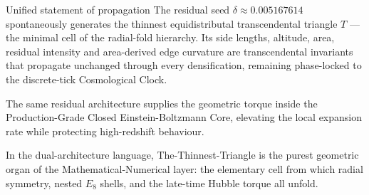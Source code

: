 Unified statement of propagation
The residual seed \(\delta\approx 0.005167614\) spontaneously generates the thinnest equidistributal transcendental triangle \(T\) — the minimal cell of the radial-fold hierarchy. Its side lengths, altitude, area, residual intensity and area-derived edge curvature are transcendental invariants that propagate unchanged through every densification, remaining phase-locked to the discrete-tick Cosmological Clock.  

The same residual architecture supplies the geometric torque inside the Production-Grade Closed Einstein-Boltzmann Core, elevating the local expansion rate while protecting high-redshift behaviour.  

In the dual-architecture language, The-Thinnest-Triangle is the purest geometric organ of the Mathematical-Numerical layer: the elementary cell from which radial symmetry, nested \(E_8\) shells, and the late-time Hubble torque all unfold.
